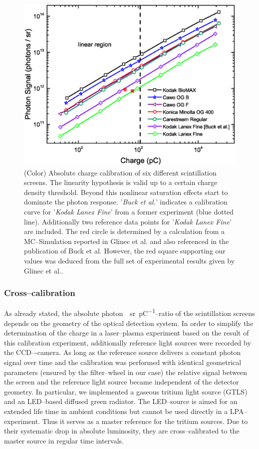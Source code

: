 \documentclass[%
reprint,
amsmath,
amssymb,
aip,
rsi, 
numerical,
floatfix,
]{revtex4-1}
\newcommand{\myCite}[1]{\textcolor{blue}{\cite{#1}}}
\begin{document}
\begin{figure}
\includegraphics[width=\textwidth]{./Figures/Absolute}%
\caption{\label{fig:Calib}(Color) Absolute charge calibration of six different scintillation screens.
The linearity hypothesis is valid up to a certain charge density threshold. Beyond this nonlinear saturation effects start to dominate the photon response.
'\textit{Buck et al.}' indicates a calibration curve for '\textit{Kodak Lanex Fine}' from a former experiment \cite{Buck2010} (blue dotted line).
Additionally two reference data points for '\textit{Kodak Lanex Fine}' are included. 
The red circle is determined by a calculation from a MC--Simulation reported in Glinec et al. \cite{Glinec2006} and also referenced in the publication of Buck et al. 
However, the red square supporting our values was deduced from the full set of experimental results given by Glinec et al.. }
\end{figure}

\subsubsection{\label{Cc}Cross--calibration}
As already stated, the absolute \si{photon \per \steradian \per \pico\coulomb}--ratio of the scintillation screens depends on the geometry of the optical detection system. 
In order to simplify the determination of the charge in a laser--plasma experiment based on the result of this calibration experiment, additionally reference light sources were recorded by the CCD–-camera. 
As long as the reference source delivers a constant photon signal over time and the calibration was performed with identical geometrical parameters (ensured by the filter--wheel in our case) the relative signal between the screen and the reference light source became independent of the detector geometry.
In particular, we implemented a gaseous tritium light source (GTLS) and an LED--based diffused green radiator.
The LED--source is aimed for an extended life time in ambient conditions but cannot be used directly in a LPA--experiment.
Thus it serves as a master reference for the tritium sources.
Due to their systematic drop in absolute luminosity\myCite{Buck2010}, they are cross--calibrated to the master source in regular time intervals.
 
\end{document}
